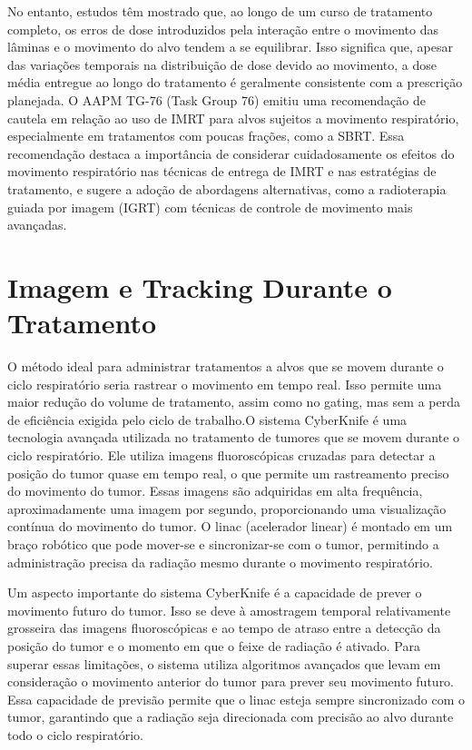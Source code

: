\documentclass[11pt,a4paper]{article}
\begin{document}
	No entanto, estudos têm mostrado que, ao longo de um curso de tratamento completo, os erros de dose introduzidos pela interação entre o movimento das lâminas e o movimento do alvo tendem a se equilibrar. Isso significa que, apesar das variações temporais na distribuição de dose devido ao movimento, a dose média entregue ao longo do tratamento é geralmente consistente com a prescrição planejada. O AAPM TG-76 (Task Group 76) emitiu uma recomendação de cautela em relação ao uso de IMRT para alvos sujeitos a movimento respiratório, especialmente em tratamentos com poucas frações, como a SBRT. Essa recomendação destaca a importância de considerar cuidadosamente os efeitos do movimento respiratório nas técnicas de entrega de IMRT e nas estratégias de tratamento, e sugere a adoção de abordagens alternativas, como a radioterapia guiada por imagem (IGRT) com técnicas de controle de movimento mais avançadas.

\section{Imagem e Tracking Durante o Tratamento}

	O método ideal para administrar tratamentos a alvos que se movem durante o ciclo respiratório seria rastrear o movimento em tempo real. Isso permite uma maior redução do volume de tratamento, assim como no gating, mas sem a perda de eficiência exigida pelo ciclo de trabalho.O sistema CyberKnife é uma tecnologia avançada utilizada no tratamento de tumores que se movem durante o ciclo respiratório. Ele utiliza imagens fluoroscópicas cruzadas para detectar a posição do tumor quase em tempo real, o que permite um rastreamento preciso do movimento do tumor. Essas imagens são adquiridas em alta frequência, aproximadamente uma imagem por segundo, proporcionando uma visualização contínua do movimento do tumor. O linac (acelerador linear) é montado em um braço robótico que pode mover-se e sincronizar-se com o tumor, permitindo a administração precisa da radiação mesmo durante o movimento respiratório.

	Um aspecto importante do sistema CyberKnife é a capacidade de prever o movimento futuro do tumor. Isso se deve à amostragem temporal relativamente grosseira das imagens fluoroscópicas e ao tempo de atraso entre a detecção da posição do tumor e o momento em que o feixe de radiação é ativado. Para superar essas limitações, o sistema utiliza algoritmos avançados que levam em consideração o movimento anterior do tumor para prever seu movimento futuro. Essa capacidade de previsão permite que o linac esteja sempre sincronizado com o tumor, garantindo que a radiação seja direcionada com precisão ao alvo durante todo o ciclo respiratório.
\end{document}
